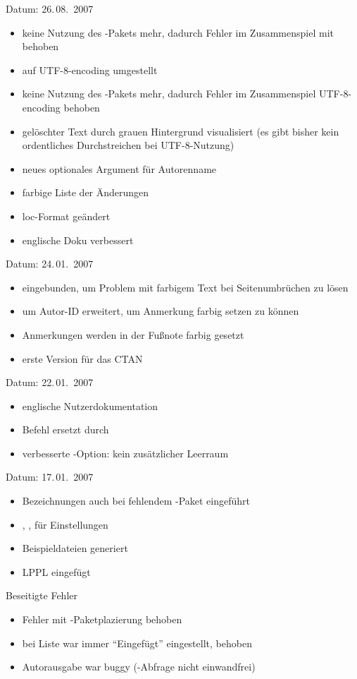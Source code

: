 Datum: 26.\,08.~2007
\begin{itemize}
	\item keine Nutzung des -Pakets mehr, dadurch Fehler im Zusammenspiel mit  behoben
	\item auf UTF-8-encoding umgestellt
	\item keine Nutzung des -Pakets mehr, dadurch Fehler im Zusammenspiel UTF-8-encoding behoben
	\item gelöschter Text durch grauen Hintergrund visualisiert (es gibt bisher kein ordentliches Durchstreichen bei UTF-8-Nutzung)
	\item neues optionales Argument für Autorenname
	\item farbige Liste der Änderungen
	\item loc-Format geändert
	\item englische Doku verbessert
\end{itemize}


Datum: 24.\,01.~2007
\begin{itemize}
	\item {} eingebunden, um Problem mit farbigem Text bei Seitenumbrüchen zu lösen
	\item {} um Autor-ID erweitert, um Anmerkung farbig setzen zu können
	\item Anmerkungen werden in der Fußnote farbig gesetzt
	\item erste Version für das CTAN
\end{itemize}


Datum: 22.\,01.~2007
\begin{itemize}
	\item englische Nutzerdokumentation
	\item Befehl  ersetzt durch 
	\item verbesserte -Option: kein zusätzlicher Leerraum
\end{itemize}


Datum: 17.\,01.~2007
\begin{itemize}
	\item Bezeichnungen auch bei fehlendem -Paket eingeführt
	\item {}, ,  für Einstellungen
	\item Beispieldateien generiert
	\item LPPL eingefügt
\end{itemize}
Beseitigte Fehler
\begin{itemize}
	\item Fehler mit -Paketplazierung behoben
	\item bei Liste war immer "`Eingefügt"' eingestellt, behoben
	\item Autorausgabe war buggy (-Abfrage nicht einwandfrei)
\end{itemize}

